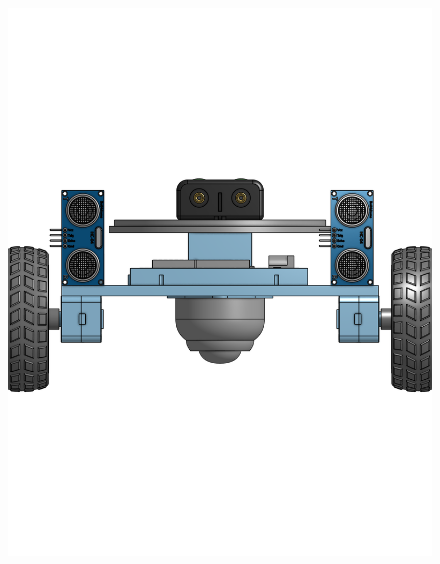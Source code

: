\documentclass[a4paper,12pt]{article}
\begin{document}
\begin{center}\begin{figure}[H]\centering\includegraphics[height=0.45\textheight]{./model_images/a8.png}\end{figure}\FloatBarrier\end{center}
\end{document}
